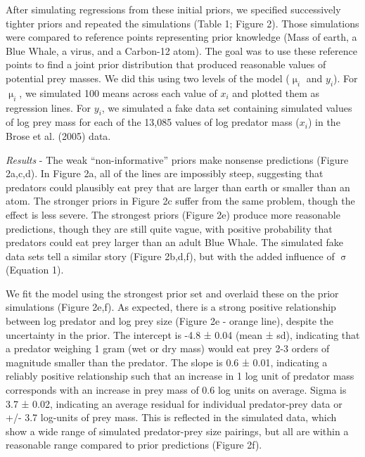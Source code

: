\documentclass[
  12pt,
]{article}
\begin{document}
After simulating regressions from these initial priors, we specified
successively tighter priors and repeated the simulations (Table 1;
Figure 2). Those simulations were compared to reference points
representing prior knowledge (Mass of earth, a Blue Whale, a virus, and
a Carbon-12 atom). The goal was to use these reference points to find a
joint prior distribution that produced reasonable values of potential
prey masses. We did this using two levels of the model (\(\upmu_i\) and
\(y_i\)). For \(\upmu_i\), we simulated 100 means across each value of
\(x_i\) and plotted them as regression lines. For \(y_i\), we simulated
a fake data set containing simulated values of log prey mass for each of
the 13,085 values of log predator mass (\(x_i\)) in the Brose et al.
(2005) data.

\emph{Results} - The weak ``non-informative'' priors make nonsense
predictions (Figure 2a,c,d). In Figure 2a, all of the lines are
impossibly steep, suggesting that predators could plausibly eat prey
that are larger than earth or smaller than an atom. The stronger priors
in Figure 2c suffer from the same problem, though the effect is less
severe. The strongest priors (Figure 2e) produce more reasonable
predictions, though they are still quite vague, with positive
probability that predators could eat prey larger than an adult Blue
Whale. The simulated fake data sets tell a similar story (Figure
2b,d,f), but with the added influence of \(\upsigma\) (Equation 1).

We fit the model using the strongest prior set and overlaid these on the
prior simulations (Figure 2e,f). As expected, there is a strong positive
relationship between log predator and log prey size (Figure 2e - orange
line), despite the uncertainty in the prior. The intercept is -4.8 ±
0.04 (mean ± sd), indicating that a predator weighing 1 gram (wet or dry
mass) would eat prey 2-3 orders of magnitude smaller than the predator.
The slope is 0.6 ± 0.01, indicating a reliably positive relationship
such that an increase in 1 log unit of predator mass corresponds with an
increase in prey mass of 0.6 log units on average. Sigma is 3.7 ± 0.02,
indicating an average residual for individual predator-prey data or +/-
3.7 log-units of prey mass. This is reflected in the simulated data,
which show a wide range of simulated predator-prey size pairings, but
all are within a reasonable range compared to prior predictions (Figure
2f).
\end{document}
